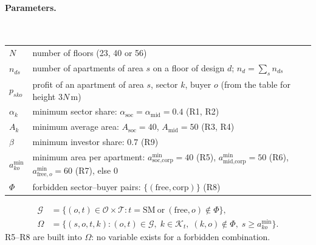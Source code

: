 \documentclass[11pt,a4paper]{article}
\newcommand{\Oset}{\mathcal{O}}
\newcommand{\Kset}{\mathcal{K}}
\newcommand{\Tset}{\mathcal{T}}
\newcommand{\Gset}{\mathcal{G}}
\newcommand{\soc}{\text{soc}}
\newcommand{\midd}{\text{mid}}
\newcommand{\fre}{\text{free}}
\newcommand{\cor}{\text{corp}}
\begin{document}
\paragraph{Parameters.}\ \\[-12pt]
\begin{center}
\begin{tabular}{@{}l p{13cm}@{}}
$N$ & number of floors (23, 40 or 56) \\
$n_{ds}$ & number of apartments of area $s$ on a floor of design $d$; \quad $n_d=\sum_s n_{ds}$ \\
$p_{sko}$ & profit of an apartment of area $s$, sector $k$, buyer $o$ (from the table for height $3N$\,m) \\
$\alpha_k$ & minimum sector share: $\alpha_\soc=\alpha_\midd=0.4$ (R1, R2) \\
$A_k$ & minimum average area: $A_\soc=40$, $A_\midd=50$ (R3, R4) \\
$\beta$ & minimum investor share: $0.7$ (R9) \\
$a^{\min}_{ko}$ & minimum area per apartment: $a^{\min}_{\soc,\cor}=40$ (R5), $a^{\min}_{\midd,\cor}=50$ (R6), $a^{\min}_{\fre,o}=60$ (R7), else 0 \\
$\Phi$ & forbidden sector--buyer pairs: $\{(\fre,\cor)\}$ (R8)
\end{tabular}
\end{center}
\vspace{-6pt}
\begin{align*}
\Gset &= \bigl\{(o,t)\in\Oset\times\Tset : t=\text{SM} \ \text{or}\ (\fre,o)\notin\Phi\bigr\},\\
\Omega &= \bigl\{(s,o,t,k) : (o,t)\in\Gset,\; k\in\Kset_t,\; (k,o)\notin\Phi,\; s\ge a^{\min}_{ko}\bigr\}.
\end{align*}
R5--R8 are built into $\Omega$: no variable exists for a forbidden combination.
\end{document}

